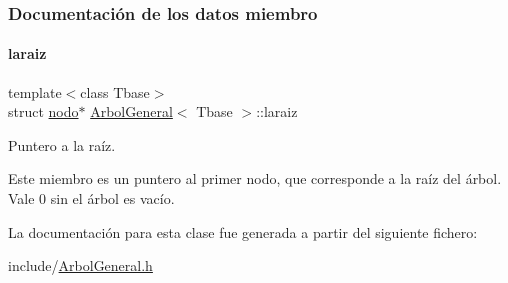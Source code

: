 \subsubsection{Documentación de los datos miembro}
\hypertarget{classArbolGeneral_a14a859dc79b8df4d5a77b5c871713c9e}{}\label{classArbolGeneral_a14a859dc79b8df4d5a77b5c871713c9e} 
\paragraph{\texorpdfstring{laraiz}{laraiz}}
{\footnotesize\ttfamily template$<$class Tbase$>$ \\
struct \hyperlink{structArbolGeneral_1_1nodo}{nodo}$\ast$ \hyperlink{classArbolGeneral}{Arbol\+General}$<$ Tbase $>$\+::laraiz\hspace{0.3cm}{\ttfamily [private]}}



Puntero a la raíz. 

Este miembro es un puntero al primer nodo, que corresponde a la raíz del árbol. Vale 0 sin el árbol es vacío. 

La documentación para esta clase fue generada a partir del siguiente fichero\+:\begin{DoxyCompactItemize}
\item 
include/\hyperlink{ArbolGeneral_8h}{Arbol\+General.\+h}\end{DoxyCompactItemize}
